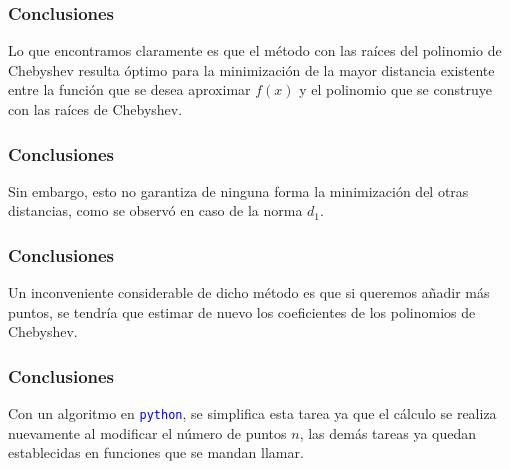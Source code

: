 \documentclass[12pt]{beamer}
\begin{document}
\begin{frame}
\frametitle{Conclusiones}
Lo que encontramos claramente es que el método con las raíces del polinomio de Chebyshev resulta óptimo para la minimización de la mayor distancia existente entre la función que se desea aproximar $f (x)$ y el polinomio que se construye con las raíces de Chebyshev.
\end{frame}
\begin{frame}
\frametitle{Conclusiones}
Sin embargo, esto no garantiza de ninguna forma la minimización del otras distancias, como se observó en caso de la norma $d_{1}$.
\end{frame}
\begin{frame}
\frametitle{Conclusiones}
Un inconveniente considerable de dicho método es que si queremos añadir más puntos, se tendría que estimar de nuevo los coeficientes de los polinomios de Chebyshev.
\end{frame}
\begin{frame}
\frametitle{Conclusiones}
Con un algoritmo en \textcolor{blue}{\texttt{python}}, se simplifica esta tarea ya que el cálculo se realiza nuevamente al modificar el número de puntos $n$, las demás tareas ya quedan establecidas en funciones que se mandan llamar.
\end{frame}
\end{document}
